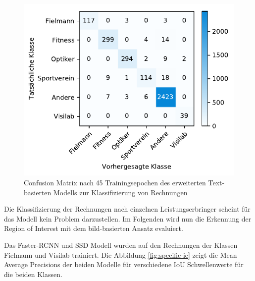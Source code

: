 \begin{figure}[h!] 
    \captionsetup{width=.9\linewidth}
    \caption{Confusion Matrix nach 45 Trainingsepochen des erweiterten Text-basierten Modells zur Klassifizierung von Rechnungen}
    \label{fielmann-cm}
    \centering
    \includegraphics[scale=1]{graphics/matplot/class__fielmann__cm_44.pdf}
\end{figure}

Die Klassifizierung der Rechnungen nach einzelnen Leistungserbringer scheint für das Modell kein Problem darzustellen. Im Folgenden wird nun die Erkennung der Region of Interest mit dem bild-basierten Ansatz evaluiert.

Das Faster-RCNN und SSD Modell wurden auf den Rechnungen der Klassen Fielmann und Visilab trainiert. Die Abbildung \ref{fig:specific-ie} zeigt die Mean Average Precisions der beiden Modelle für verschiedene IoU Schwellenwerte für die beiden Klassen.

